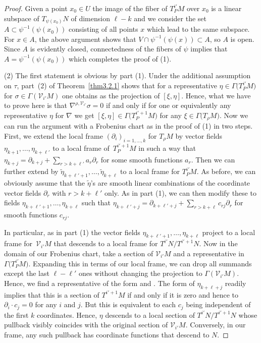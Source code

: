 \documentclass[10pt,a4paper]{amsart}
\numberwithin{equation}{section}
\def\Cal{\mathcal}
\newcommand{\si}{\sigma}
\newcommand{\Ga}{\Gamma}
\begin{document}
\begin{proof}
Given a point $x_0\in U$ the image of the fiber of $T^{i'}_PM$ over $x_0$ is a linear
subspace of $T_{\psi(x_0)}N$ of dimension $\ell-k$ and we consider the set
$A\subset \psi^{-1}(\psi(x_0))$ consisting of all points $x$ which lead to the same
subspace. For $x\in A$, the above argument shows that
$V\cap\psi^{-1}(\psi(x))\subset A$, so $A$ is open. Since $A$ is evidently closed,
connectedness of the fibers of $\psi$ implies that $A=\psi^{-1}(\psi(x_0))$ which
completes the proof of (1).



(2) The first statement is obvious by part (1). Under the additional assumption on
$\tau$, part~(2) of Theorem~\ref{thm3.2.1} shows that for a representative
$\eta\in\Ga\bigl(T^{i'}_PM\bigr)$ for $\si\in\Ga(\Cal V_{i'}M)$ one obtains \smash{$\nabla^{\rho,\Cal
 V_{i'}}_\xi\si$} as the projection of $[\xi,\eta]$. Hence, what we have to prove here
is that $\nabla^{\rho,\Cal V_{i'}}\si=0$ if and only if for one or equivalently any
representative $\eta$ for $\nabla$ we get $[\xi,\eta]\in\Ga\bigl(T^{i'+1}_PM\bigr)$ for any
$\xi\in\Ga\bigl(T_\rho M\bigr)$. Now we can run the argument with a Frobenius chart as in the
proof of (1) in two steps. First, we extend the local frame
$(\partial_i)_{i=1,\dots,k}$ for $T_\rho M$ by vector fields
$\eta_{k+1},\dots,\eta_{k+\ell'}$ to a local frame of~$T^{i'+1}_P M$ in such a way
that $\eta_{k+j}=\partial_{k+j}+\sum_{r>k+\ell'}a_r\partial_r$ for some smooth
functions $a_r$. Then we can further extend by
$\tilde\eta_{k+\ell'+1},\dots,\tilde\eta_{k+\ell}$ to a local frame for
$T^{i'}_PM$. As before, we can obviously assume that the $\tilde\eta$'s are smooth
linear combinations of the coordinate vector fields $\partial_r$ with $r>k+\ell'$
only. As in part (1), we can then modify these to fields
$\eta_{k+\ell'+1},\dots,\eta_{k+\ell}$ such that
$\eta_{k+\ell'+j}=\partial_{k+\ell'+j}+\sum_{r>k+\ell}c_{rj}\partial_r$ for smooth
functions $c_{rj}$.

In particular, as in part (1) the vector fields
$\eta_{k+\ell'+1},\dots,\eta_{k+\ell}$ project to a local frame for~$\Cal V_{i'}M$
that descends to a local frame for $T^{i'}N/T^{i'+1}N$. Now in the domain of our
Frobenius chart, take a section of $\Cal V_{i'}M$ and a representative in
$\Ga\bigl(T^{i'}_PM\bigr)$. Expanding this in terms of our local frame, we can drop all
summands except the last $\ell-\ell'$ ones without changing the projection to
$\Ga(\Cal V_{i'}M)$. Hence, we find a representative of the form
 and
. The
form of $\eta_{k+\ell+j}$ readily implies that this is a section of $T^{i'+1}M$ if
and only if it is zero and hence to $\partial_i\cdot c_j=0$ for any $i$ and $j$. But
this is equivalent to each $c_j$ being independent of the first $k$
coordinates. Hence, $\eta$ descends to a local section of $T^{i'}N/T^{i'+1}N$ whose
pullback visibly coincides with the original section of $\Cal V_{i'}M$. Conversely,
in our frame, any such pullback has coordinate functions that descend to $N$.
\end{proof}
\end{document}
